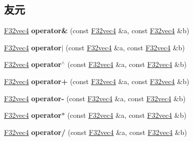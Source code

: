 \subsection*{友元}
\begin{DoxyCompactItemize}
\item 
\mbox{\label{class_f32vec4_a1d682530f7288a49ef05a6f50a2dc104}} 
\hyperlink{class_f32vec4}{F32vec4} {\bfseries operator\&} (const \hyperlink{class_f32vec4}{F32vec4} \&a, const \hyperlink{class_f32vec4}{F32vec4} \&b)
\item 
\mbox{\label{class_f32vec4_a42b23f3c1ebf71f072b5374b45d045f2}} 
\hyperlink{class_f32vec4}{F32vec4} {\bfseries operator$\vert$} (const \hyperlink{class_f32vec4}{F32vec4} \&a, const \hyperlink{class_f32vec4}{F32vec4} \&b)
\item 
\mbox{\label{class_f32vec4_ae402def209a8176d33a3bb2b61688646}} 
\hyperlink{class_f32vec4}{F32vec4} {\bfseries operator$^\wedge$} (const \hyperlink{class_f32vec4}{F32vec4} \&a, const \hyperlink{class_f32vec4}{F32vec4} \&b)
\item 
\mbox{\label{class_f32vec4_a9e37a2dcaa5d24a5ef81792bbdcbf62a}} 
\hyperlink{class_f32vec4}{F32vec4} {\bfseries operator+} (const \hyperlink{class_f32vec4}{F32vec4} \&a, const \hyperlink{class_f32vec4}{F32vec4} \&b)
\item 
\mbox{\label{class_f32vec4_a538fed023544b5d9f5a8c3976686fac1}} 
\hyperlink{class_f32vec4}{F32vec4} {\bfseries operator-\/} (const \hyperlink{class_f32vec4}{F32vec4} \&a, const \hyperlink{class_f32vec4}{F32vec4} \&b)
\item 
\mbox{\label{class_f32vec4_a8f39a0a5635194f1df83ed8df1aac396}} 
\hyperlink{class_f32vec4}{F32vec4} {\bfseries operator$\ast$} (const \hyperlink{class_f32vec4}{F32vec4} \&a, const \hyperlink{class_f32vec4}{F32vec4} \&b)
\item 
\mbox{\label{class_f32vec4_ab0e56bd4477f0677bc78aaa20b39b996}} 
\hyperlink{class_f32vec4}{F32vec4} {\bfseries operator/} (const \hyperlink{class_f32vec4}{F32vec4} \&a, const \hyperlink{class_f32vec4}{F32vec4} \&b)
\item 
\mbox{\label{class_f32vec4_a1055f9d4323a2db0cd100b480ad978f3}} 

\end{DoxyCompactItemize}
